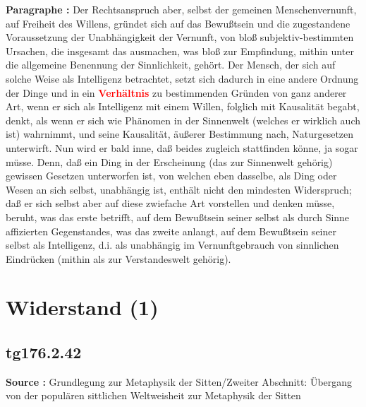 \documentclass[a4paper,12pt,twoside]{book}
\newcommand{\match}[1]{\textcolor{red}{\textbf{#1}}}
\newcommand{\unnumberedsection}[1]{
	\section*{#1}
	\addcontentsline{toc}{section}{#1}
	\markright{#1}
}
\begin{document}
	\noindent\textbf{Paragraphe : }
	Der Rechtsanspruch aber, selbst der gemeinen Menschenvernunft, auf Freiheit des Willens, gründet sich auf das Bewußtsein und die zugestandene Voraussetzung der Unabhängigkeit der Vernunft, von bloß subjektiv-bestimmten Ursachen, die insgesamt das ausmachen, was bloß zur Empfindung, mithin unter die allgemeine Benennung der Sinnlichkeit, gehört. Der Mensch, der sich auf solche Weise als Intelligenz betrachtet, setzt sich dadurch in eine andere Ordnung der Dinge und in ein \match{Verhältnis} zu bestimmenden Gründen von ganz anderer Art, wenn er sich als Intelligenz mit einem Willen, folglich mit Kausalität begabt, denkt, als wenn er sich wie Phänomen in der Sinnenwelt (welches er wirklich auch ist) wahrnimmt, und seine Kausalität, äußerer Bestimmung nach, Naturgesetzen unterwirft. Nun wird er bald inne, daß beides zugleich stattfinden könne, ja sogar müsse. Denn, daß ein Ding in der Erscheinung (das zur Sinnenwelt gehörig) gewissen Gesetzen unterworfen ist, von welchen eben dasselbe, als Ding oder Wesen an sich selbst, unabhängig ist, enthält nicht den mindesten Widerspruch; daß er sich selbst aber auf diese zwiefache Art vorstellen und denken müsse, beruht, was das erste betrifft, auf dem Bewußtsein seiner selbst als durch Sinne affizierten Gegenstandes, was das zweite anlangt, auf dem Bewußtsein seiner selbst als Intelligenz, d.i. als unabhängig im Vernunftgebrauch von sinnlichen Eindrücken (mithin als zur Verstandeswelt gehörig). 
	
	\unnumberedsection{Widerstand (1)} 
	\subsection*{tg176.2.42} 
	\textbf{Source : }Grundlegung zur Metaphysik der Sitten/Zweiter Abschnitt: Übergang von der populären sittlichen Weltweisheit zur Metaphysik der Sitten\\  
	
\end{document}
